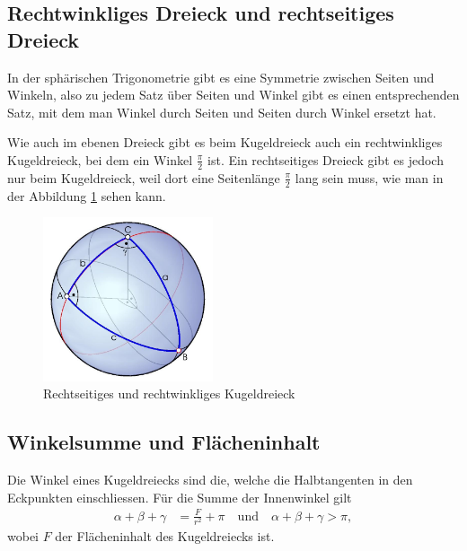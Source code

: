 \subsection{Rechtwinkliges Dreieck und rechtseitiges Dreieck}
In der sphärischen Trigonometrie gibt es eine Symmetrie zwischen Seiten und Winkeln, also zu jedem Satz über Seiten und Winkel gibt es einen entsprechenden Satz, mit dem man Winkel durch Seiten und Seiten durch Winkel ersetzt hat.

Wie auch im ebenen Dreieck gibt es beim Kugeldreieck auch ein rechtwinkliges Kugeldreieck, bei dem ein Winkel $\frac{\pi}{2}$ ist. 
Ein rechtseitiges Dreieck gibt es jedoch nur beim Kugeldreieck, weil dort eine Seitenlänge $\frac{\pi}{2}$ lang sein muss, wie man in der Abbildung \ref{recht} sehen kann.

\begin{figure}
	
	\begin{center}
		\includegraphics[width=5cm]{papers/nav/bilder/recht.jpg}
		\caption[Rechtseitiges und rechtwinkliges Kugeldreieck]{Rechtseitiges und rechtwinkliges Kugeldreieck}
		\label{recht}
	\end{center}	
\end{figure}

\subsection{Winkelsumme und Flächeninhalt}
\label{trigo}
	


Die Winkel eines Kugeldreiecks sind die, welche die Halbtangenten in den Eckpunkten einschliessen. 
Für die Summe der Innenwinkel gilt
\begin{align}
	\alpha+\beta+\gamma &= \frac{F}{r^2} + \pi \quad \text{und} \quad \alpha+\beta+\gamma > \pi, \nonumber
\end{align}
wobei $F$ der Flächeninhalt des Kugeldreiecks ist.
